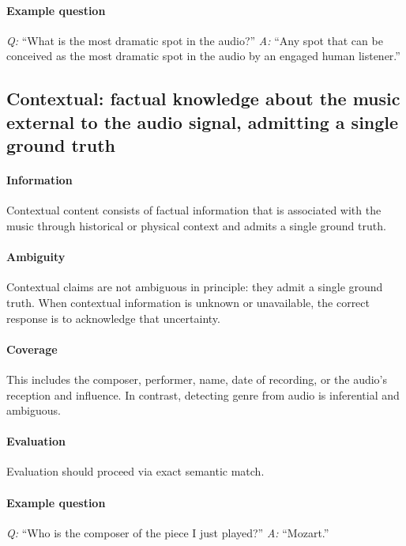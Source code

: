 \documentclass[conference,a4paper]{APSIPA2026}
\begin{document}
\paragraph{Example question}
\emph{Q:} ``What is the most dramatic spot in the audio?''  
\emph{A:} ``Any spot that can be conceived as the most dramatic spot in the audio by an engaged human listener.''





\subsection{\textbf{Contextual}: factual knowledge about the music external to the audio signal, admitting a single ground truth}

\paragraph{Information}
Contextual content consists of factual information that is associated with the music through historical or physical context and admits a single ground truth. 

\paragraph{Ambiguity}
Contextual claims are not ambiguous in principle: they admit a single ground truth. When contextual information is unknown or unavailable, the correct response is to acknowledge that uncertainty.

\paragraph{Coverage}

This includes the composer, performer, name, date of recording, or the audio's reception and influence. In contrast, detecting genre from audio is inferential and ambiguous.

\paragraph{Evaluation}
Evaluation should proceed via exact semantic match.

\paragraph{Example question}
\emph{Q:} ``Who is the composer of the piece I just played?''  
\emph{A:} ``Mozart.''
\end{document}
